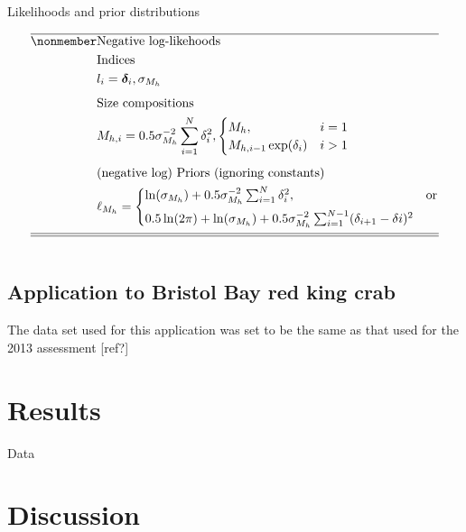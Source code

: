 \documentclass[12pt,letterpaper]{article}
\newcounter{saveEq}
\def\putEq{\setcounter{saveEq}{\value{equation}}}
\def\getEq{\setcounter{equation}{\value{saveEq}}}
\def\tableEq{ %
    \putEq \setcounter{equation}{0}
    \renewcommand{\theequation}{T\arabic{table}.\arabic{equation}}
    \vspace{-5mm}
    }
\def\normalEq{ %
    \getEq
    \renewcommand{\theequation}{\arabic{section}.\arabic{equation}}}
\begin{document}
\begin{table}
      \centering
      \caption{Likelihoods and prior distributions}
      \label{tab:likelihoods}
      \tableEq
      \begin{align}
      \hline \nonmember
      &\mbox{Negative log-likehoods} \nonumber \\
      &\mbox{Indices} \nonumber \\
      & l_i =  \bm{\delta}_i, \sigma_{M_h}  \label{T5.1} \\[1ex]
      &\mbox{Size compositions} \nonumber \\
      & M_{h,i} =0.5 \sigma_{M_h}^{-2} \sum_{i=1}^{N} \delta_{i}^2, 
      \begin{cases}
        M_h, &i=1\\
        M_{h,i-1} \exp(\delta_i) &i>1
      \end{cases} \label{T5.2} \\[1ex]
      &\mbox{(negative log) Priors (ignoring constants)} \nonumber \\
      &\ell_{M_h} = 
      \begin{cases}
      \ln(\sigma_{M_h}) 
      + 0.5 \sigma_{M_h}^{-2} \sum_{i=1}^{N} \delta_{i}^2, & \mbox{or}  \\[1ex]
      0.5 \ln(2 \pi) + \ln(\sigma_{M_h}) 
      + 0.5 \sigma_{M_h}^{-2}\sum_{i=1}^{N-1}(\delta_{i+1} - \delta{i})^{2}  \\
      \end{cases}\label{T5.3}\\[1ex]
      \hline \hline \nonumber
      \end{align}
      \normalEq
    \end{table}






%
%
  \subsection*{Application to Bristol Bay red king crab} %
  The data set used for this application was set to be the same as that used for the 2013 assessment [ref?]
  
  
  \section*{Results} %
  Data 
  
  \section*{Discussion} %
  


  
  
\end{document}
